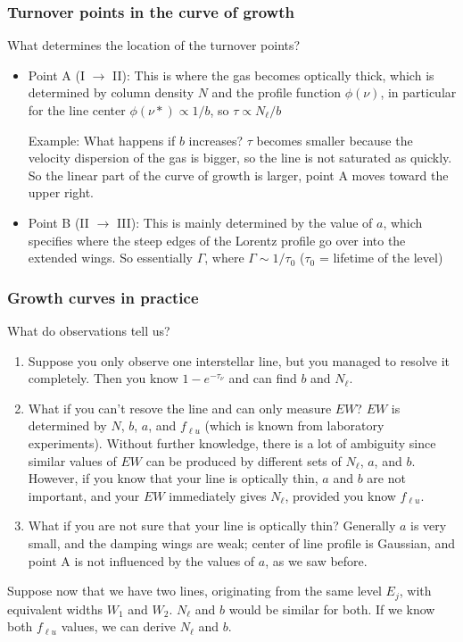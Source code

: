 \documentclass[12pt]{article}
\newcommand{\mar}[1]{\hspace{0pt}\marginpar{-\textcolor{black}{#1}-}}
\begin{document}
\subsubsection{Turnover points in the curve of growth}
\mar{94}What determines the location of the turnover points?
\begin{itemize}
    \item Point A (I $\rightarrow$ II): This is where the gas becomes
        optically thick, which is determined by column density $N$ and
        the profile function $\phi(\nu)$, in particular for the line
        center $\phi(\nu*) \propto 1/b$, so $\tau \propto N_{\ell}/b$

        Example: What happens if $b$ increases? $\tau$ becomes smaller
        because the velocity dispersion of the gas is bigger, so the
        line is not saturated as quickly. So the linear part of the
        curve of growth is larger, point A moves toward the upper right.
    \item Point B (II $\rightarrow$ III): This is mainly determined by
        the value of $a$, which specifies where the steep edges of the
        Lorentz profile go over into the extended wings. So essentially
        $\Gamma$, where $\Gamma \sim 1/\tau_{0}$ ($\tau_{0}$ = lifetime
        of the level)
\end{itemize}
\subsubsection{Growth curves in practice}
What do observations tell us?
\begin{enumerate}[itemsep=1ex, label={\Roman*}.]
    \item Suppose you only observe one interstellar line, but you managed
        to resolve it completely. Then you know $ 1 - e^{-\tau_{\nu}} $
        and can find $b$ and $N_{\ell}$.
    \item What if you can't resove the line and can only measure $EW$?
        $EW$ is determined by $N$, $b$, $a$, and $f_{{\ell}u}$ (which is known
        from laboratory experiments).
        \mar{95}Without further knowledge, there is a lot of ambiguity
        since similar values of $EW$ can be produced by different sets of
        $N_{\ell}$, $a$, and $b$. However, if you know that your line is
        optically thin, $a$ and $b$ are not important, and your $EW$
        immediately gives $N_{\ell}$, provided you know $f_{{\ell}u}$.
    \item What if you are not sure that your line is optically thin?
        Generally $a$ is very small, and the damping wings are weak;
        center of line profile is Gaussian, and point A is not influenced
        by the values of $a$, as we saw before.
\end{enumerate}
Suppose now that we have two lines, originating from the same level $E_{j}$,
with equivalent widths $W_{1}$ and $W_{2}$. $N_{\ell}$ and $b$ would be
similar for both. If we know both $f_{{\ell}u}$ values, we can derive
$N_{\ell}$ and $b$.
\end{document}
